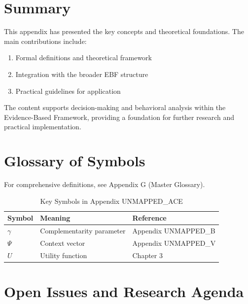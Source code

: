 \section{Summary}
\label{sec:ace-summary}

This appendix has presented the key concepts and theoretical foundations.
The main contributions include:

\begin{enumerate}
    \item Formal definitions and theoretical framework
    \item Integration with the broader EBF structure
    \item Practical guidelines for application
\end{enumerate}

The content supports decision-making and behavioral analysis within the
Evidence-Based Framework, providing a foundation for further research
and practical implementation.



\section{Glossary of Symbols}
\label{sec:ace-glossary}

For comprehensive definitions, see Appendix G (Master Glossary).

\begin{table}[htbp]
\centering
\caption{Key Symbols in Appendix UNMAPPED_ACE}
\begin{tabular}{lll}
\toprule
\textbf{Symbol} & \textbf{Meaning} & \textbf{Reference} \\
\midrule
$\gamma$ & Complementarity parameter & Appendix UNMAPPED_B \\
$\Psi$ & Context vector & Appendix UNMAPPED_V \\
$U$ & Utility function & Chapter 3 \\
\bottomrule
\end{tabular}
\end{table}



\section{Open Issues and Research Agenda}
\label{sec:ace-open-issues}

